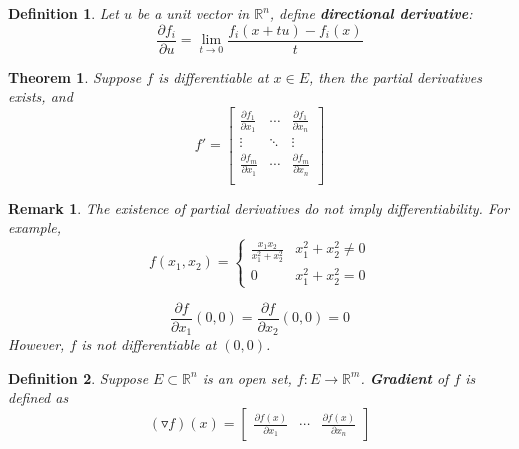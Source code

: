 \documentclass[aps,pra,onecolumn,notitlepage,superscriptaddress]{revtex4-1}
\newcommand{\R}{\mathbb{R}}
\newtheorem{theo}{Theorem}
\newtheorem{defi}{Definition}
\newtheorem{rem}{Remark}
\begin{document}
    \begin{defi}
        Let $u$ be a unit vector in $\R^n$, define \textbf{directional derivative}:
        \begin{equation}
            \frac{\partial f_i}{\partial u} = \lim_{t \to 0} \frac{f_i(x + tu)-f_i(x)}{t}
        \end{equation}
    \end{defi}

    \begin{theo}
        Suppose $f$ is differentiable at $x \in E$, then the partial derivatives exists, and
        \begin{equation}
            f' = \begin{bmatrix}
                \frac{\partial f_1}{\partial x_1} & \cdots & \frac{\partial f_1}{\partial x_n} \\
                \vdots & \ddots & \vdots \\
                \frac{\partial f_m}{\partial x_1} & \cdots & \frac{\partial f_m}{\partial x_n} \\
            \end{bmatrix}
        \end{equation}
    \end{theo}

    \begin{rem}
        The existence of partial derivatives do not imply differentiability. For example,
        \begin{equation}
            f(x_1,x_2)
            = \begin{cases}
                \frac{x_1x_2}{x_1^2+x_2^2} & x_1^2 + x_2^2 \neq 0 \\ 
                0 & x_1^2 + x_2^2 = 0
            \end{cases}
        \end{equation}

        \begin{equation}
            \frac{\partial f}{\partial x_1}
            (0,0) = \frac{\partial f}{\partial x_2}
            (0,0) = 0
        \end{equation}
        However, $f$ is not differentiable at $(0,0)$.
    \end{rem}

    \begin{defi}
        Suppose $E \subset \R^n$ is an open set, $f: E \to \R^m$. \textbf{Gradient} of $f$ is defined as
        \begin{equation}
            (\triangledown f)(x) =
            \begin{bmatrix}
                \frac{\partial f(x)}{\partial x_1} & \cdots & \frac{\partial f(x)}{\partial x_n}
            \end{bmatrix}
        \end{equation}
    \end{defi}
\end{document}
